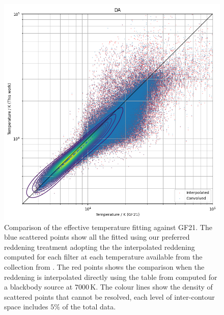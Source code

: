 \documentclass[fleqn,usenatbib]{rasti}
\begin{document}
\begin{figure}
    \centering
    \includegraphics[width=\columnwidth]{compare_fusillo_edr3.png}
    \caption{Comparison of the effective temperature fitting against GF21. The blue scattered points show all the fitted using our preferred reddening treatment adopting the the interpolated reddening computed for each filter at each temperature available from the collection from \citet{2010MmSAI..81..921K}. The red points shows the comparison when the reddening is interpolated directly using the table from \citet{2011ApJ...737..103S} computed for a blackbody source at $7000$\,K. The colour lines show the density of scattered points that cannot be resolved, each level of inter-contour space includes $5\%$ of the total data.}
    \label{fig:comparison}
\end{figure}
\end{document}
